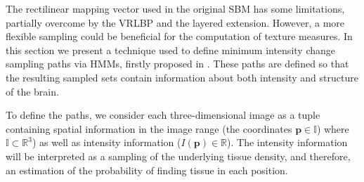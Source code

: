 \label{sec:hmmpaths}
The rectilinear mapping vector used in the original \ac{SBM} \cite{Martinez-Murcia2014225,Martinez-MurciaVRLBP,Martinez-Murcia2015} has some limitations, partially overcome by the \ac{VRLBP} and the layered extension. However, a more flexible sampling could be beneficial for the computation of texture measures. In this section we present a technique used to define minimum intensity change sampling paths via \acp{HMM}, firstly proposed in \cite{Martinez-Murcia2016}. These paths are defined so that the resulting sampled sets contain information about both intensity and structure of the brain. 

To define the paths, we consider each three-dimensional image as a tuple containing spatial information in the image range (the coordinates $\mathbf{p} \in \mathbb{I}$) where $\mathbb{I}\subset \mathbb{R}^3$) as well as intensity information ($I(\mathbf{p}) \in \mathbb{R}$). The intensity information will be interpreted as a sampling of the underlying tissue density, and therefore, an estimation of the probability of finding tissue in each position. 

